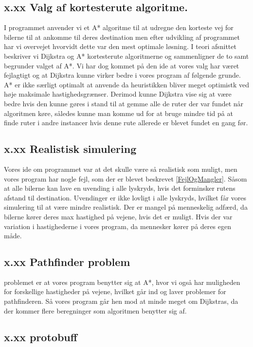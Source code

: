 \subsection{x.xx Valg af kortesterute algoritme.}
I programmet anvender vi et A* algoritme til at udregne den korteste vej for bilerne til at ankomme til deres destination men efter udvikling af programmet har vi overvejet hvorvidt dette var den mest optimale løsning. I teori afsnittet beskriver vi Dijkstra og A* kortesterute algoritmerne og sammenligner de to samt begrunder valget af A*. Vi har dog kommet på den ide at vores valg har været fejlagtigt og at Dijkstra kunne virker bedre i vores program af følgende grunde. A* er ikke særligt optimalt at anvende da heuristikken bliver meget optimistk ved høje maksimale hastighedsgrænser. Derimod kunne Dijkstra vise sig at være bedre hvis den kunne gøres i stand til at gemme alle de ruter der var fundet når algoritmen køre, således kunne man komme ud for at bruge mindre tid på at finde ruter i andre instancer hvis denne rute allerede er blevet fundet en gang før. 

\subsection{x.xx Realistisk simulering}
Vores ide om programmet var at det skulle være så realistisk som muligt, men vores program har nogle fejl, som der er blevet beskrevet \ref{FejlOgMangler}. Såsom at alle bilerne kan lave en uvending i alle lyskryds, hvis det forminsker rutens afstand til destination. Uvendinger er ikke lovligt i alle lyskryds, hvilket får vores simulering til at være mindre realistisk. Der er mangel på menneskelig adfærd, da bilerne kører deres max hastighed på vejene, hvis det er muligt. Hvis der var variation i hastighederne i vores program, da mennesker kører på deres egen måde.

\subsection{x.xx Pathfinder problem}
problemet er at vores program benytter sig at A*, hvor vi også har muligheden for forskellige hastigheder på vejene, hvilket går ind og laver problemer for pathfinderen. Så vores program går hen mod at minde meget om Dijkstras, da der kommer flere beregninger som algoritmen benytter sig af.


\subsection{x.xx protobuff}



